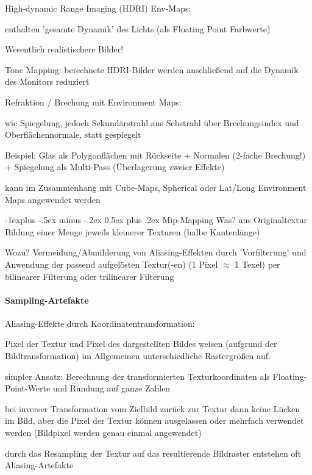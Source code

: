 \documentclass[landscape]{article}
\makeatletter
\renewcommand{\subsection}{\@startsection{subsection}{2}{0mm}%
                                {-1explus -.5ex minus -.2ex}%
                                {0.5ex plus .2ex}%
                                {\normalfont\normalsize\bfseries}}
\makeatother
\begin{document}
\begin{multicols}{3}
  
  High-dynamic Range Imaging (HDRI) Env-Maps:
  \begin{itemize*}
    \item enthalten 'gesamte Dynamik' des Lichts (als Floating Point Farbwerte)
    \item Wesentlich realistischere Bilder!
    \item Tone Mapping: berechnete HDRI-Bilder werden anschließend auf die Dynamik des Monitors reduziert
    \item Refraktion / Brechung mit Environment Maps:
    \item wie Spiegelung, jedoch Sekundärstrahl aus Sehstrahl über Brechungsindex und Oberflächennormale, statt gespiegelt
    \item Beispiel: Glas als Polygonflächen mit Rückseite + Normalen (2-fache Brechung!) + Spiegelung als Multi-Pass (Überlagerung zweier Effekte)
    \item kann im Zusammenhang mit Cube-Maps, Spherical oder Lat/Long Environment Maps angewendet werden
  \end{itemize*}
  
  
  \subsection{ Mip-Mapping}
  Was? aus Originaltextur Bildung einer Menge jeweils kleinerer Texturen (halbe Kantenlänge)
  
  Wozu? Vermeidung/Abmilderung von Aliasing-Effekten durch 'Vorfilterung' und Anwendung der passend aufgelösten Textur(-en) (1 Pixel $\approx$ 1 Texel) per bilinearer Filterung oder trilinearer Filterung
  
  \paragraph{Sampling-Artefakte}
  Aliasing-Effekte durch Koordinatentransformation:
  \begin{itemize*}
    \item Pixel der Textur und Pixel des dargestellten Bildes weisen (aufgrund der Bildtransformation) im Allgemeinen unterschiedliche Rastergrößen auf.
    \item simpler Ansatz: Berechnung der transformierten Texturkoordinaten als Floating-Point-Werte und Rundung auf ganze Zahlen
    \item bei inverser Transformation vom Zielbild zurück zur Textur dann keine Lücken im Bild, aber die Pixel der Textur können ausgelassen oder mehrfach verwendet werden (Bildpixel werden genau einmal angewendet)
    \item durch das Resampling der Textur auf das resultierende Bildraster entstehen oft Aliasing-Artefakte
  \end{itemize*}
  

\end{multicols}
\end{document}
